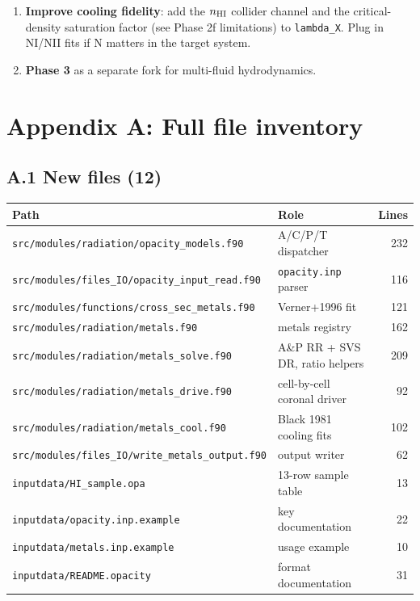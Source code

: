 \documentclass[english,a4paper]{my_memo}
\begin{document}
\begin{enumerate}
\item \textbf{Improve cooling fidelity}: add the
$n_{\rm HI}$ collider channel and the critical-density saturation
factor (see Phase 2f limitations) to \texttt{lambda\_X}. Plug in
NI/NII fits if N matters in the target system.

\item \textbf{Phase 3} as a separate fork for multi-fluid hydrodynamics.
\end{enumerate}

\section*{Appendix A: Full file inventory}

\subsection*{A.1 New files (12)}

\begin{center}
\begin{tabular}{|l|p{6cm}|r|}
\hline
Path & Role & Lines \\
\hline
\texttt{src/modules/radiation/opacity\_models.f90}      & A/C/P/T dispatcher          & 232 \\
\texttt{src/modules/files\_IO/opacity\_input\_read.f90} & \texttt{opacity.inp} parser & 116 \\
\texttt{src/modules/functions/cross\_sec\_metals.f90}   & Verner+1996 fit             & 121 \\
\texttt{src/modules/radiation/metals.f90}               & metals registry             & 162 \\
\texttt{src/modules/radiation/metals\_solve.f90}        & A\&P RR + SVS DR, ratio helpers & 209 \\
\texttt{src/modules/radiation/metals\_drive.f90}        & cell-by-cell coronal driver &  92 \\
\texttt{src/modules/radiation/metals\_cool.f90}         & Black 1981 cooling fits     & 102 \\
\texttt{src/modules/files\_IO/write\_metals\_output.f90}& output writer               &  62 \\
\texttt{inputdata/HI\_sample.opa}                   & 13-row sample table         &  13 \\
\texttt{inputdata/opacity.inp.example}                  & key documentation           &  22 \\
\texttt{inputdata/metals.inp.example}                   & usage example               &  10 \\
\texttt{inputdata/README.opacity}                       & format documentation        &  31 \\
\hline
\end{tabular}
\end{center}
\end{document}
